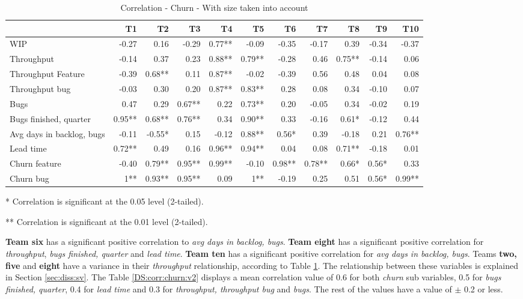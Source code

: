 \documentclass[UKenglish]{ifimaster}  %
\begin{document}
 \begin{table}[H]
\begin{adjustwidth}{-1.5cm}{}
 \centering
 \begin{tabular}{|l|r|r|r|r|r|r|r|r|r|r|}
\hline
 &  \bf{T1} & \bf{T2} & \bf{T3} & \bf{T4} & \bf{T5} & \bf{T6} & \bf{T7} & \bf{T8} & \bf{T9} & \bf{T10}\\ \hline
 WIP  & -0.27 & 0.16 & -0.29 & 0.77** & -0.09 & -0.35 & -0.17 & 0.39 & -0.34 & -0.37 \\ \hline
 Throughput  & -0.14 & 0.37 & 0.23 & 0.88** & 0.79** & -0.28 & 0.46 & 0.75** & -0.14 & 0.06 \\ \hline
 Throughput Feature  & -0.39 & 0.68** & 0.11 & 0.87** & -0.02 & -0.39 & 0.56 & 0.48 & 0.04 & 0.08 \\ \hline
 Throughput bug  & -0.03 & 0.30 & 0.20 & 0.87** & 0.83** & 0.28 & 0.08 & 0.34 & -0.10 & 0.07 \\ \hline
 Bugs  & 0.47 & 0.29 & 0.67** & 0.22 & 0.73** & 0.20 & -0.05 & 0.34 & -0.02 & 0.19 \\ \hline
 Bugs finished, quarter  & 0.95** & 0.68** & 0.76** & 0.34 & 0.90** & 0.33 & -0.16 & 0.61* & -0.12 & 0.44 \\ \hline
 Avg days in backlog, bugs  & -0.11 & -0.55* & 0.15 & -0.12 & 0.88** & 0.56* & 0.39 & -0.18 & 0.21 & 0.76** \\ \hline
 Lead time  & 0.72** & 0.49 & 0.16 & 0.96** & 0.94** & 0.04 & 0.08 & 0.71** & -0.18 & 0.01 \\ \hline
 Churn feature  & -0.40 & 0.79** & 0.95** & 0.99** & -0.10 & 0.98** & 0.78** & 0.66* & 0.56* & 0.33 \\ \hline
 Churn bug  & 1** & 0.93** & 0.95** & 0.09 & 1** & -0.19 & 0.25 & 0.51 & 0.56* & 0.99** \\ \hline
\end{tabular}
 \caption{Correlation - Churn - With size taken into account}
 \label{corr:churn:v2}
 \centerline {* Correlation is significant at the 0.05 level (2-tailed).}
\centerline{** Correlation is significant at the 0.01 level (2-tailed).}
\end{adjustwidth}
\end{table}
\textbf{Team six} has a significant positive correlation to \textit{avg days in backlog, bugs}. \textbf{Team eight} has a significant positive correlation for \textit{throughput}, \textit{bugs finished, quarter} and \textit{lead time}. \textbf{Team ten} has a significant positive correlation for \textit{avg days in backlog, bugs}.  Teams \textbf{two, five} and \textbf{eight} have a variance in their \textit{throughput} relationship, according to Table \ref{corr:churn:v2}. The relationship between these variables is explained in Section \ref{sec:diss:sv}. The Table \ref{DS:corr:churn:v2} displays a mean correlation value of 0.6 for both \textit{churn} sub variables, 0.5 for \textit{bugs finished, quarter}, 0.4 for \textit{lead time} and 0.3 for \textit{throughput, throughput bug} and \textit{bugs}. The rest of the values have a value of $\pm$ 0.2 or less.
\end{document}
